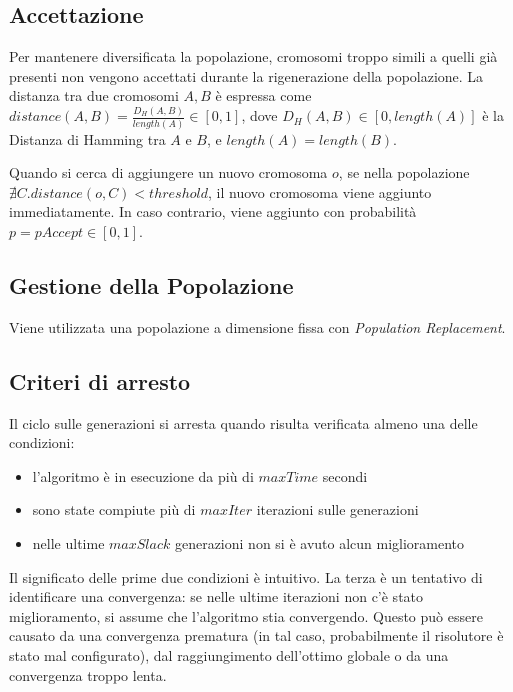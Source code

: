\documentclass[a4paper, 10pt]{report}
\begin{document}
\subsection{Accettazione}
Per mantenere diversificata la popolazione, cromosomi troppo simili
a quelli già presenti non vengono accettati durante la rigenerazione della
popolazione.
La distanza tra due cromosomi $A, B$ è espressa come
$distance(A, B) = \frac{D_H(A, B)}{length(A)} \in [0, 1]$, dove
$D_H(A, B) \in [0, length(A)]$ è la Distanza di Hamming tra $A$ e $B$, e
$length(A) = length(B)$.

Quando si cerca di aggiungere un nuovo cromosoma $o$, se nella
popolazione $\nexists C. distance(o, C) < threshold$, il nuovo cromosoma
viene aggiunto immediatamente. In caso contrario, viene aggiunto con
probabilità $p = pAccept \in [0, 1]$.


\subsection{Gestione della Popolazione}
Viene utilizzata una popolazione a dimensione fissa con \emph{Population
Replacement}.


\subsection{Criteri di arresto}
Il ciclo sulle generazioni si arresta quando risulta verificata almeno
una delle condizioni:
\begin{itemize}
  \item l'algoritmo è in esecuzione da più di $maxTime$ secondi
  \item sono state compiute più di $maxIter$ iterazioni sulle generazioni
  \item nelle ultime $maxSlack$ generazioni non si è avuto alcun miglioramento
\end{itemize}
Il significato delle prime due condizioni è intuitivo. La terza è un
tentativo di identificare una convergenza: se nelle ultime iterazioni
non c'è stato miglioramento, si assume che l'algoritmo stia convergendo.
Questo può essere causato da una convergenza prematura (in tal caso,
probabilmente il risolutore è stato mal configurato), dal raggiungimento
dell'ottimo globale o da una convergenza troppo lenta.



\end{document}
